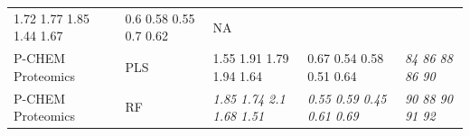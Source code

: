 \documentclass[utf8]{frontiersHLTH} %
\begin{document}
\begin{longtable}[]{@{}lllll@{}}
\begin{minipage}[t]{0.19\columnwidth}
1.72 1.77 1.85 1.44 1.67\strut
\end{minipage} & \begin{minipage}[t]{0.19\columnwidth}\raggedright\strut
0.6 0.58 0.55 0.7 0.62\strut
\end{minipage} & \begin{minipage}[t]{0.27\columnwidth}\raggedright\strut
NA\strut
\end{minipage}\tabularnewline
\begin{minipage}[t]{0.13\columnwidth}\raggedright\strut
P-CHEM Proteomics\strut
\end{minipage} & \begin{minipage}[t]{0.08\columnwidth}\raggedright\strut
PLS\strut
\end{minipage} & \begin{minipage}[t]{0.19\columnwidth}\raggedright\strut
1.55 1.91 1.79 1.94 1.64\strut
\end{minipage} & \begin{minipage}[t]{0.19\columnwidth}\raggedright\strut
0.67 0.54 0.58 0.51 0.64\strut
\end{minipage} & \begin{minipage}[t]{0.27\columnwidth}\raggedright\strut
\emph{84 86 88 86 90}\strut
\end{minipage}\tabularnewline
\begin{minipage}[t]{0.13\columnwidth}\raggedright\strut
P-CHEM Proteomics\strut
\end{minipage} & \begin{minipage}[t]{0.08\columnwidth}\raggedright\strut
RF\strut
\end{minipage} & \begin{minipage}[t]{0.19\columnwidth}\raggedright\strut
\emph{1.85 1.74 2.1 1.68 1.51}\strut
\end{minipage} & \begin{minipage}[t]{0.19\columnwidth}\raggedright\strut
\emph{0.55 0.59 0.45 0.61 0.69}\strut
\end{minipage} & \begin{minipage}[t]{0.27\columnwidth}\raggedright\strut
\emph{90 88 90 91 92}\strut
\end{minipage}\tabularnewline
\bottomrule
\end{longtable}
\end{document}
